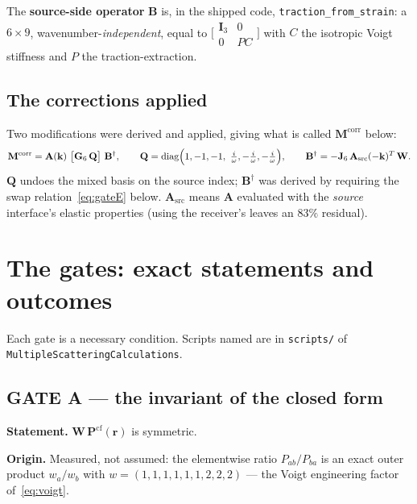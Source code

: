 \documentclass[11pt,a4paper]{article}
\newcommand{\bI}{\mathbf{I}}
\newcommand{\bJ}{\mathbf{J}}
\newcommand{\bW}{\mathbf{W}}
\newcommand{\bQ}{\mathbf{Q}}
\newcommand{\bA}{\mathbf{A}}
\newcommand{\bB}{\mathbf{B}}
\newcommand{\bG}{\mathbf{G}}
\newcommand{\bM}{\mathbf{M}}
\newcommand{\bP}{\mathbf{P}}
\begin{document}
The \textbf{source-side operator} $\bB$ is, in the shipped code,
\texttt{traction\_from\_strain}: a $6\times9$, wavenumber-\emph{independent},
equal to $\bigl[\begin{smallmatrix} \bI_3 & 0\\ 0 & PC\end{smallmatrix}\bigr]$
with $C$ the isotropic Voigt stiffness and $P$ the traction-extraction.

\subsection{The corrections applied}

Two modifications were derived and applied, giving what is called
$\bM^{\text{corr}}$ below:
\begin{equation}\label{eq:corr}
  \bM^{\text{corr}} = \bA(\mathbf{k})\ \bigl[\bG_6\,\bQ\bigr]\ \bB^{\dagger},
  \qquad
  \bQ = \operatorname{diag}\Bigl(1,-1,-1,\ \tfrac{i}{\omega},-\tfrac{i}{\omega},-\tfrac{i}{\omega}\Bigr),
  \qquad
  \bB^{\dagger} = -\bJ_6\,\bA_{\text{src}}(-\mathbf{k})^{T}\,\bW .
\end{equation}
$\bQ$ undoes the mixed basis on the source index; $\bB^{\dagger}$ was derived by
requiring the swap relation~\eqref{eq:gateE} below.  $\bA_{\text{src}}$ means
$\bA$ evaluated with the \emph{source} interface's elastic properties (using
the receiver's leaves an $83\%$ residual).

\section{The gates: exact statements and outcomes}

Each gate is a necessary condition.  Scripts named are in
\texttt{scripts/} of \texttt{MultipleScatteringCalculations}.

\subsection{GATE A --- the invariant of the closed form}\label{sec:gateA}

\textbf{Statement.}  $\bW\,\bP^{\text{cf}}(\mathbf{r})$ is symmetric.

\textbf{Origin.}  Measured, not assumed: the elementwise ratio
$P_{ab}/P_{ba}$ is an exact outer product $w_a/w_b$ with
$w = (1,1,1,1,1,1,2,2,2)$ --- the Voigt engineering factor
of~\eqref{eq:voigt}.
\end{document}
